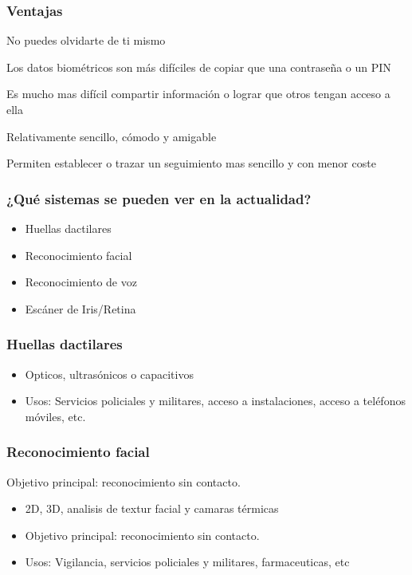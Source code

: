 \documentclass{beamer}
\begin{document}
\begin{frame}
\frametitle{Ventajas}
    \item<1-> No puedes olvidarte de ti mismo
    \item<2-> Los datos biométricos son más difíciles de copiar que una contraseña o un PIN 
    \item<3-> Es mucho mas difícil compartir información o lograr que otros tengan acceso a ella
    \item<4-> Relativamente sencillo, cómodo y amigable
    \item<5-> Permiten establecer o trazar un seguimiento mas sencillo y con menor coste
\end{frame}
\begin{frame}


\begin{frame}
\frametitle{¿Qué sistemas se pueden ver en la actualidad?}
\begin{itemize}
    \item<1-> Huellas dactilares  
    \item<2-> Reconocimiento facial
    \item<3-> Reconocimiento de voz
    \item<4-> Escáner de Iris/Retina
\end{itemize}
\end{frame}

\begin{frame}
\frametitle{Huellas dactilares}
\begin{itemize}
 \item<1-> Opticos, ultrasónicos o capacitivos
\item<2->Usos: Servicios policiales y militares, acceso a instalaciones, acceso a teléfonos móviles, etc.
\end{itemize}
\end{frame}

\begin{frame}
\frametitle{Reconocimiento facial}
Objetivo principal: reconocimiento sin contacto.
\begin{itemize}
    \item<1-> 2D, 3D, analisis de textur facial y camaras térmicas 
    \item<2-> Objetivo principal: reconocimiento sin contacto.
    \item<3-> Usos: Vigilancia, servicios policiales y militares, farmaceuticas, etc
\end{itemize}
\end{frame}



\end{frame}
\end{document}
